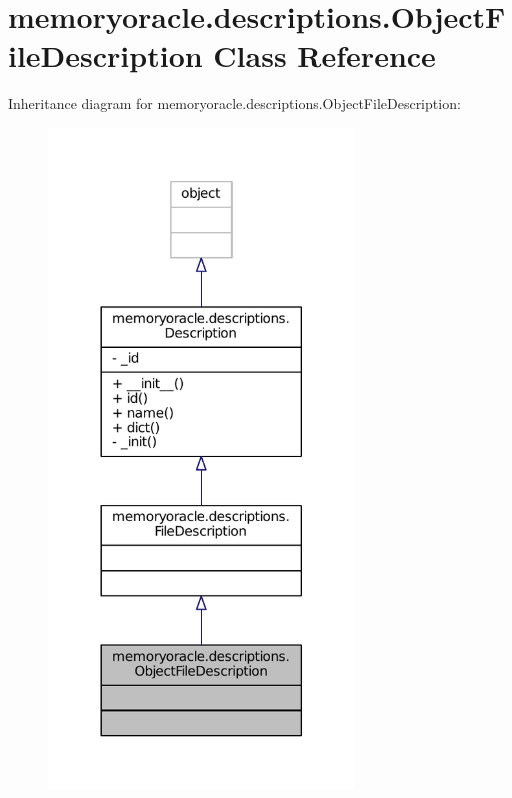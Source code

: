 \hypertarget{classmemoryoracle_1_1descriptions_1_1ObjectFileDescription}{}\section{memoryoracle.\+descriptions.\+Object\+File\+Description Class Reference}
\label{classmemoryoracle_1_1descriptions_1_1ObjectFileDescription}


Inheritance diagram for memoryoracle.\+descriptions.\+Object\+File\+Description\+:\nopagebreak
\begin{figure}[H]
\begin{center}
\leavevmode
\includegraphics[width=230pt]{classmemoryoracle_1_1descriptions_1_1ObjectFileDescription__inherit__graph}
\end{center}
\end{figure}


